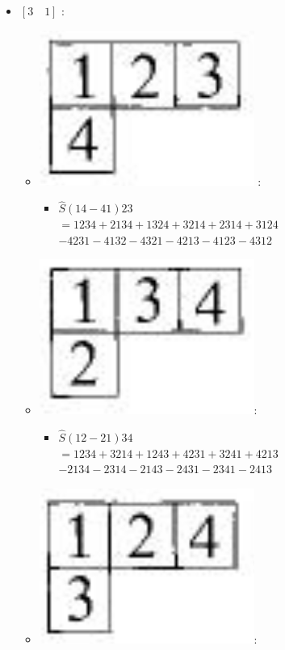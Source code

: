 \documentclass[12pt,a4paper]{article}
\begin{document}
\begin{itemize}
\item  $\left[ 3\quad 1\right]$ :
\begin{itemize}
\item  \includegraphics[scale=0.2]{build/young-31-123.png} : 
\begin{itemize}
 \item  $\hat{S} \left( 14 -41\right)23 $ \\
 $= 1234 + 2134 + 1324 + 3214 + 2314 + 3124 $ \\
 $- 4231 - 4132 - 4321 - 4213 - 4123 - 4312 $ 
\end{itemize}
\item \includegraphics[scale=0.2]{build/young-31-134.png}: 
\begin{itemize}
\item  $ \hat{S} \left( 12-21\right)34$\\
  $= 1234 + 3214 + 1243 + 4231 + 3241 + 4213$  \\
  $ - 2134 - 2314 - 2143 - 2431 - 2341 - 2413$ 
\end{itemize}
\item \includegraphics[scale=0.2]{build/young-31-124.png}: 

\end{itemize}
\end{itemize}
\end{document}
